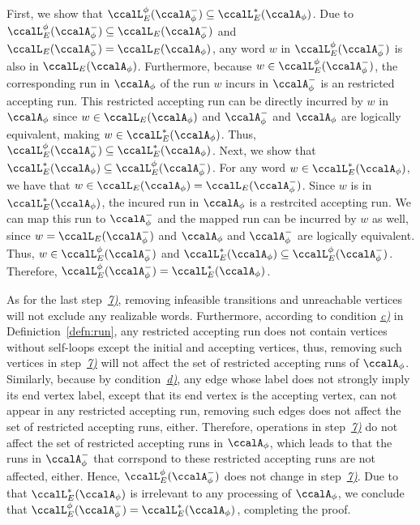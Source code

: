 \documentclass[Afour,sageh,times]{sagej}
\newcommand{\autop}{\ccalA_{\phi}}
\begin{document}
{First, we show that $\ccalL_E^\phi(\autop^-) \subseteq \ccalL^*_E(\autop)$. Due to $\ccalL_E^\phi(\autop^-) \subseteq \ccalL_E(\autop^-)$ and $\ccalL_E(\autop^-)= \ccalL_E(\autop)$,  any word $w$ in $\ccalL_E^\phi(\autop^-)$ is also in  $ \ccalL_E(\autop)$. Furthermore, because $w \in \ccalL_E^\phi(\autop^-)$, the corresponding run in $\autop$ of the run $w$ incurs in $\autop^-$ is an restricted accepting run. This restricted accepting run  can be directly incurred by $w$ in $\autop$ since $w \in \ccalL_E(\autop)$ and $\autop^-$ and $\autop$ are logically equivalent, making $w \in \ccalL^*_E(\autop)$.
Thus, $\ccalL_E^\phi(\autop^-) \subseteq \ccalL^*_E(\autop)$. Next, we show that $\ccalL^*_E(\autop) \subseteq \ccalL_E^\phi(\autop^-)$. For any word $w \in \ccalL^*_E(\autop)$, we have that $w \in \ccalL_E(\autop)  = \ccalL_E(\autop^-)$. Since $w$ is in $\ccalL^*_E(\autop)$, the incured run in $\autop$ is a restrcited accepting run. We can map this run to $\autop^-$ and the mapped run can be incurred by $w$ as well, since $w = \ccalL_E(\autop^-)$ and $\autop$ and $\autop^-$ are logically equivalent. Thus, $w \in \ccalL_E^\phi(\autop^-)$ and $\ccalL^*_E(\autop) \subseteq \ccalL_E^\phi(\autop^-)$. Therefore, $\ccalL_E^\phi(\autop^-) = \ccalL^*_E(\autop) $.


As for the last step~\hyperref[prune:infeasible]{\it 7)}, removing infeasible transitions and unreachable vertices will not exclude any realizable words. Furthermore, according to condition \hyperref[cond:c]{\it c)} in Definiction~\ref{defn:run}, any restricted  accepting run  does not contain vertices without self-loops except the initial and accepting vertices, thus, removing such vertices in step~\hyperref[prune:infeasible]{\it 7)} will not affect the  set of restricted accepting runs of $\autop$. Similarly, because by condition~\hyperref[cond:d]{\it d)}, any edge whose label does not strongly imply its end vertex label, except that its end vertex is the accepting vertex,  can not appear in any restricted accepting run, removing such edges does not affect the set of restricted accepting runs, either.  Therefore, operations in step~\hyperref[prune:infeasible]{\it 7)} do not affect the set of restricted accepting runs in $\autop$, which leads to that the runs in $\autop^-$ that corrspond to these restricted accepting runs are not affected, either. Hence, $\ccalL^\phi_E(\autop^-)$ does not change in step~\hyperref[prune:infeasible]{\it 7)}. Due to that $\ccalL^*_E(\autop)$ is irrelevant to any processing of $\autop$, we conclude that $\ccalL^\phi_E(\autop^-) = \ccalL^*_E(\autop)$, completing the proof.
}
\end{document}
